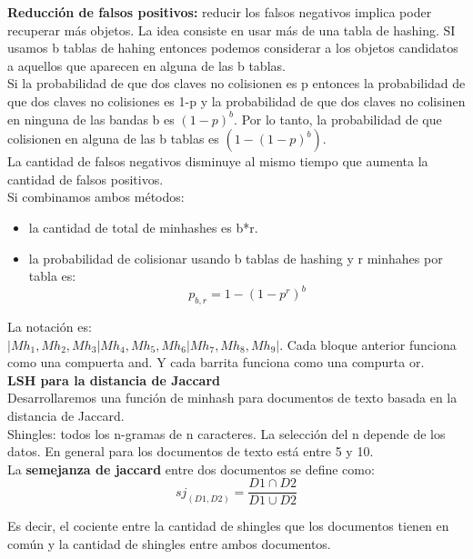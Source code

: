 \documentclass[titlepage,a4paper]{article}
\begin{document}
\textbf{Reducción de falsos positivos:} reducir los falsos negativos implica poder recuperar más objetos. La idea consiste en usar más de una tabla de hashing. SI usamos b tablas de hahing entonces podemos considerar a los objetos candidatos a aquellos que aparecen en alguna de las b tablas.\\

Si la probabilidad de que dos claves no colisionen es p entonces la probabilidad de que dos claves no colisiones es 1-p y la probabilidad de que dos claves no colisinen en ninguna de las bandas b es $(1-p)^b$. Por lo tanto, la probabilidad de que colisionen en alguna de las b tablas es $(1-(1-p)^b)$. \\

La cantidad de falsos negativos disminuye al mismo tiempo que aumenta la cantidad de falsos positivos. \\

Si combinamos ambos métodos: 
\begin{itemize}
\item la cantidad de total de minhashes es b*r. 
\item la probabilidad de colisionar usando b tablas de hashing y r minhahes por tabla es: 
$$p_{b,r} = 1 - (1-p^r)^b$$
\end{itemize}

 La notación es:\\
 
$|Mh_1,Mh_2,Mh_3|Mh_4,Mh_5,Mh_6|Mh_7,Mh_8,Mh_9|$. Cada bloque anterior funciona como una compuerta and. Y cada barrita funciona como una compurta or. \\

\textbf{LSH para la distancia de Jaccard}\\

Desarrollaremos una función de minhash para documentos de texto basada en la distancia de Jaccard. \\

Shingles: todos los n-gramas de n caracteres. La selección del n depende de los datos. En general para los documentos de texto está entre 5 y 10. \\

La \textbf{semejanza de jaccard} entre dos documentos se define como: $$sj_(D1,D2) = \frac{D1 \cap D2}{D1\cup D2} $$ 

Es decir, el cociente entre la cantidad de shingles que los documentos tienen en común y la cantidad de shingles entre ambos documentos. \\
\end{document}

